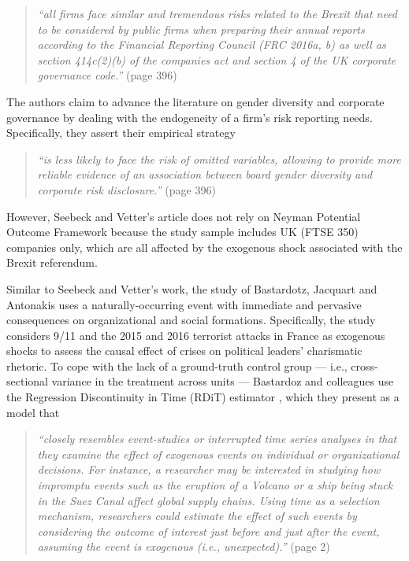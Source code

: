 \documentclass[11pt]{article}
\begin{document}
\begin{refsection}
\begin{quote}
  \textit{
    ``all firms face similar and tremendous risks related to the Brexit that
    need to be considered by public firms when preparing their annual reports
    according to the Financial Reporting Council (FRC 2016a, b) as well as
    section 414c(2)(b) of the companies act and section 4 of the UK corporate
    governance code.''
  }
  (page 396)
\end{quote}

The authors claim to advance the literature on gender diversity and 
corporate governance by dealing with the endogeneity of a firm's risk 
reporting needs. Specifically, they assert their empirical strategy

\begin{quote}
  \textit{
    ``is less likely to face the risk of omitted variables, allowing to provide
    more reliable evidence of an association between board gender diversity and
    corporate risk disclosure.''
  }
  (page 396)
\end{quote}

However, Seebeck and Vetter's article does not rely on Neyman Potential
Outcome Framework because the study sample includes UK (FTSE 350) companies
only, which are all affected by the exogenous shock associated with the Brexit 
referendum. 

Similar to Seebeck and Vetter's work, the study of Bastardotz, Jacquart and 
Antonakis \autocite*{bastardoz2022} uses a naturally-occurring event with 
immediate and pervasive consequences on organizational and social formations. 
Specifically, the study considers 9/11  and the 2015 and 2016 terrorist 
attacks in France as exogenous shocks to assess the causal effect of crises 
on political leaders' charismatic rhetoric. To cope with the lack of a ground-truth 
control group --- i.e., cross-sectional variance in the treatment across units 
---  Bastardoz and colleagues use the Regression Discontinuity in Time (RDiT) estimator 
\autocite{hausman_rapson_2018}, which they present as a model that

\begin{quote}
  \textit{
    ``closely resembles event-studies or interrupted time series
    analyses in that they examine the effect of exogenous events on
    individual or organizational decisions. For instance, a researcher
    may be interested in studying how impromptu events such as the
    eruption of a Volcano or a ship being stuck in the Suez Canal affect
    global supply chains. Using time as a selection mechanism, researchers 
    could estimate the effect of such events by considering the outcome of 
    interest just before and just after the event, assuming the
    event is exogenous (i.e., unexpected).''
  }
  (page 2)
\end{quote}


\end{refsection}
\end{document}
